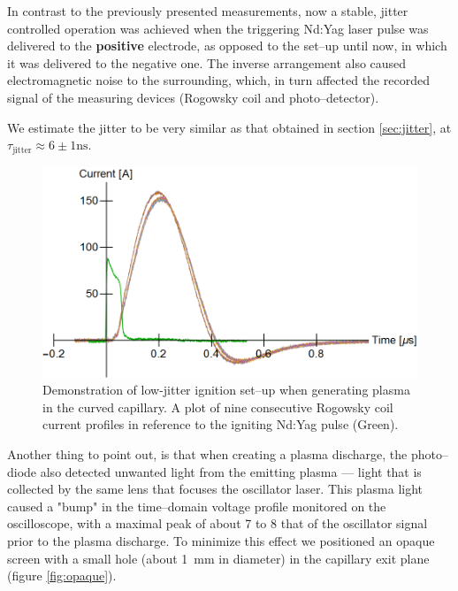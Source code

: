 \documentclass[../main.tex]{subfiles}
\begin{document}
In contrast to the previously presented measurements, now a stable, jitter controlled operation was achieved when the triggering Nd:Yag laser pulse was delivered to the \textbf{positive} electrode, as opposed to the set--up until now, in which it was delivered to the negative one. The inverse arrangement also caused electromagnetic noise to the surrounding, which, in turn affected the recorded signal of the measuring devices (Rogowsky coil and photo--detector).

We estimate the jitter to be very similar as that obtained in section \ref{sec:jitter}, at $\tau_\text{jitter}\approx 6\pm 1\si{\ns}$.

\begin{figure}
    \centering
    \includegraphics[width=\textwidth]{figures/Curved capillaries/low_jitter_curved_capillary.png}
    \caption{Demonstration of low-jitter ignition set--up when generating plasma in the curved capillary. A plot of nine consecutive Rogowsky coil current profiles in reference to the igniting Nd:Yag pulse (Green).}
    \label{fig:curved-low-jitter}
\end{figure}



Another thing to point out, is that when creating a plasma discharge, the photo--diode also detected unwanted light from the emitting plasma --- light that is collected by the same lens that focuses the oscillator laser. This plasma light caused a "bump" in the time--domain voltage profile monitored on the oscilloscope, with a maximal peak of about 7 to 8 that of the oscillator signal prior to the plasma discharge. To minimize this effect we positioned an opaque screen with a small hole (about \SI{1}{\mm} in diameter) in the capillary exit plane (figure \ref{fig:opaque}).
\end{document}
